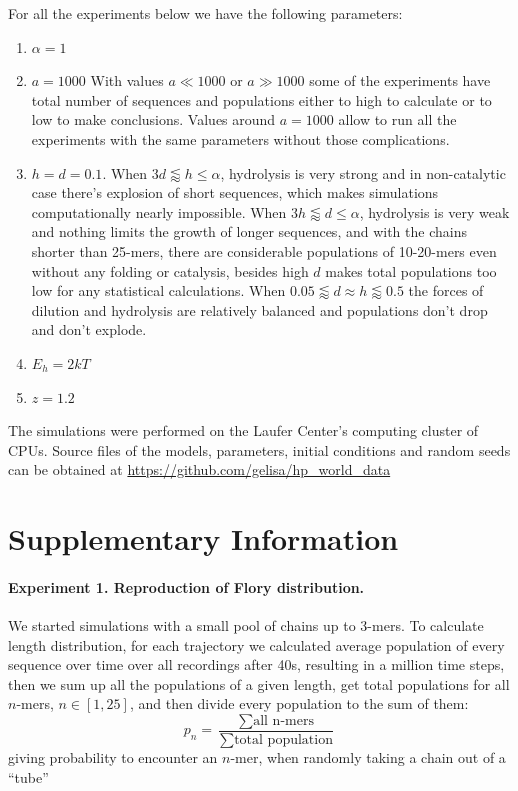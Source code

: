 \documentclass[journal=jacsat,manuscript=article,layout=twocolumn]{achemso}
\newcommand*{\ga}{\alpha}
\begin{document}
For all the experiments below we have the following parameters:
\begin{enumerate}
 \item $\ga = 1$
 \item $a=1000$
 \subitem With values $a\ll 1000\,\,\mbox{or}\,\,a\gg1000$ some of the experiments have total 
number of sequences and populations either to high to calculate or to low to make conclusions. 
Values around $a=1000$ allow to run all the experiments with the same parameters without those 
complications.
 \item $h=d=0.1$.
 \subitem When $3d\lessapprox h\leq\ga$, hydrolysis is very strong and in 
non-catalytic case there's explosion of short sequences, which makes simulations computationally 
nearly impossible. 
\subitem When $3h\lessapprox d\leq\ga$, hydrolysis is very weak and nothing limits the 
growth of longer sequences, and with the chains shorter than 25-mers, there are considerable 
populations of 10-20-mers even without any folding or catalysis, besides high $d$ makes total 
populations too low for any statistical calculations. 
\subitem When $0.05\lessapprox d\approx h \lessapprox 0.5$ the forces of dilution and hydrolysis 
are relatively balanced and populations don't drop and don't explode.
 \item $E_h = 2kT$
 \item $z=1.2$
\end{enumerate}


The simulations were performed on the Laufer Center's computing cluster of CPUs. 
Source files of the models, parameters, initial conditions and random seeds can be obtained at 
\url{https://github.com/gelisa/hp_world_data}

\appendix
\section{Supplementary Information}

\paragraph{Experiment 1. Reproduction of Flory distribution.}\label{sec:expt1}
We started simulations with a small pool of chains up to 3-mers. To calculate length distribution, 
for each trajectory we calculated average population of every sequence over time over all 
recordings 
after 40s, resulting in a million time steps, then we sum up all the populations of a given 
length, 
get total populations for all $n$-mers, $n\in[1,25]$, and then divide every population to the sum 
of them:
\begin{equation}
 p_n = \frac{\sum\mbox{all n-mers}}{\sum\mbox{total population}}
\end{equation}
giving probability to encounter an $n$-mer, when randomly taking a chain out of a ``tube''
\end{document}
